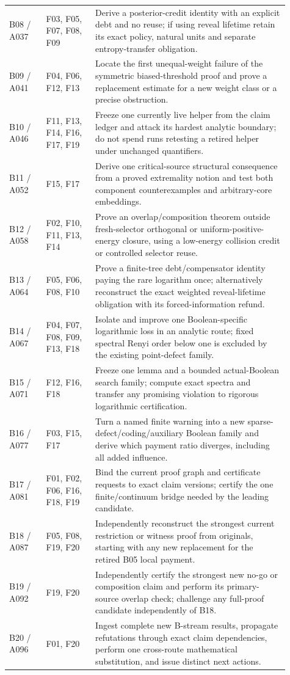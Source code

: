 \documentclass[11pt]{article}
\begin{document}
\begin{longtable}{>{\raggedright\arraybackslash}p{0.12\linewidth}>{\raggedright\arraybackslash}p{0.16\linewidth}>{\raggedright\arraybackslash}p{0.63\linewidth}}
B08 / A037 & F03, F05, F07, F08, F09 & Derive a posterior-credit identity with an explicit debt and no reuse; if using reveal lifetime retain its exact policy, natural units and separate entropy-transfer obligation. \\
B09 / A041 & F04, F06, F12, F13 & Locate the first unequal-weight failure of the symmetric biased-threshold proof and prove a replacement estimate for a new weight class or a precise obstruction. \\
B10 / A046 & F11, F13, F14, F16, F17, F19 & Freeze one currently live helper from the claim ledger and attack its hardest analytic boundary; do not spend runs retesting a retired helper under unchanged quantifiers. \\
B11 / A052 & F15, F17 & Derive one critical-source structural consequence from a proved extremality notion and test both component counterexamples and arbitrary-core embeddings. \\
B12 / A058 & F02, F10, F11, F13, F14 & Prove an overlap/composition theorem outside fresh-selector orthogonal or uniform-positive-energy closure, using a low-energy collision credit or controlled selector reuse. \\
B13 / A064 & F05, F06, F08, F10 & Prove a finite-tree debt/compensator identity paying the rare logarithm once; alternatively reconstruct the exact weighted reveal-lifetime obligation with its forced-information refund. \\
B14 / A067 & F04, F07, F08, F09, F13, F18 & Isolate and improve one Boolean-specific logarithmic loss in an analytic route; fixed spectral Renyi order below one is excluded by the existing point-defect family. \\
B15 / A071 & F12, F16, F18 & Freeze one lemma and a bounded actual-Boolean search family; compute exact spectra and transfer any promising violation to rigorous logarithmic certification. \\
B16 / A077 & F03, F15, F17 & Turn a named finite warning into a new sparse-defect/coding/auxiliary Boolean family and derive which payment ratio diverges, including all added influence. \\
B17 / A081 & F01, F02, F06, F16, F18, F19 & Bind the current proof graph and certificate requests to exact claim versions; certify the one finite/continuum bridge needed by the leading candidate. \\
B18 / A087 & F05, F08, F19, F20 & Independently reconstruct the strongest current restriction or witness proof from originals, starting with any new replacement for the retired B05 local payment. \\
B19 / A092 & F19, F20 & Independently certify the strongest new no-go or composition claim and perform its primary-source overlap check; challenge any full-proof candidate independently of B18. \\
B20 / A096 & F01, F20 & Ingest complete new B-stream results, propagate refutations through exact claim dependencies, perform one cross-route mathematical substitution, and issue distinct next actions. \\
\bottomrule
\end{longtable}
\end{document}
